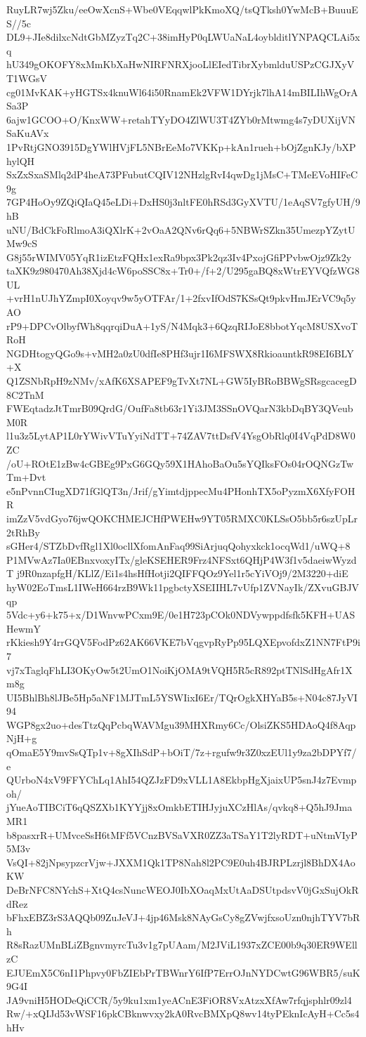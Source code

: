 RuyLR7wj5Zku/eeOwXcnS+Wbe0VEqqwlPkKmoXQ/tsQTksh0YwMcB+BuuuES//5c
DL9+JIe8dilxcNdtGbMZyzTq2C+38imHyP0qLWUaNaL4oyblditlYNPAQCLAi5xq
hU349gOKOFY8xMmKbXaHwNIRFNRXjooLlEIedTibrXybmlduUSPzCGJXyVT1WGsV
cg01MvKAK+yHGTSx4knuWl64i50RnamEk2VFW1DYrjk7lhA14mBILIhWgOrASa3P
6ajw1GCOO+O/KnxWW+retahTYyDO4ZlWU3T4ZYb0rMtwmg4s7yDUXijVNSaKuAVx
1PvRtjGNO3915DgYWlHVjFL5NBrEeMo7VKKp+kAn1rueh+bOjZgnKJy/bXPhylQH
SxZxSxaSMlq2dP4heA73PFubutCQIV12NHzlgRvI4qwDg1jMsC+TMeEVoHIFeC9g
7GP4HoOy9ZQiQIaQ45eLDi+DxHS0j3nltFE0hRSd3GyXVTU/1eAqSV7gfyUH/9hB
uNU/BdCkFoRlmoA3iQXlrK+2vOaA2QNv6rQq6+5NBWrSZkn35UmezpYZytUMw9cS
G8j55rWIMV05YqR1izEtzFQHx1exRa9bpx3Pk2qz3Iv4PxojGfiPPvbwOjz9Zk2y
taXK9z980470Ah38Xjd4cW6poSSC8x+Tr0+/f+2/U295gaBQ8xWtrEYVQfzWG8UL
+vrH1nUJhYZmpI0Xoyqv9w5yOTFAr/1+2fxvIfOdS7KSsQt9pkvHmJErVC9q5yAO
rP9+DPCvOlbyfWh8qqrqiDuA+1yS/N4Mqk3+6QzqRIJoE8bbotYqcM8USXvoTRoH
NGDHtogyQGo9s+vMH2a0zU0dfIe8PHf3ujr1I6MFSWX8RkioauntkR98EI6BLY+X
Q1ZSNbRpH9zNMv/xAfK6XSAPEF9gTvXt7NL+GW5IyBRoBBWgSRsgcacegD8C2TnM
FWEqtadzJtTmrB09QrdG/OufFa8tb63r1Yi3JM3SSnOVQarN3kbDqBY3QVeubM0R
l1u3z5LytAP1L0rYWivVTuYyiNdTT+74ZAV7ttDsfV4YsgObRlq0I4VqPdD8W0ZC
/oU+ROtE1zBw4cGBEg9PxG6GQy59X1HAhoBaOu5sYQIksFOs04rOQNGzTwTm+Dvt
e5nPvnnCIugXD71fGlQT3n/Jrif/gYimtdjppecMu4PHonhTX5oPyzmX6XfyFOHR
imZzV5vdGyo76jwQOKCHMEJCHfPWEHw9YT05RMXC0KLSsO5bb5r6szUpLr2tRhBy
sGHer4/STZbDvfRgl1Xl0ocllXfomAnFaq99SiArjuqQohyxkck1ocqWd1/uWQ+8
P1MVwAz7Ia0EBnxvoxyITx/gleKSEHER9Frz4NFSxt6QHjP4W3f1v5daeiwWyzdT
j9R0nzapfgH/KLlZ/Ei1s4hsHfHotji2QIFFQOz9Yel1r5cYiVOj9/2M3220+diE
hyW02EoTmsL1IWeH664rzB9Wk11pgbctyXSEIIHL7vUfp1ZVNayIk/ZXvuGBJVqp
5Vdc+y6+k75+x/D1WnvwPCxm9E/0e1H723pCOk0NDVywppdfsfk5KFH+UASHewmY
rKkiesh9Y4rrGQV5FodPz62AK66VKE7bVqgvpRyPp95LQXEpvofdxZ1NN7FtP9i7
vj7xTaglqFhLI3OKyOw5t2UmO1NoiKjOMA9tVQH5R5cR892ptTNlSdHgAfr1Xm8g
UI5BhlBh8lJBe5Hp5aNF1MJTmL5YSWIixI6Er/TQrOgkXHYaB5s+N04c87JyVI94
WGP8gx2uo+desTtzQqPcbqWAVMgu39MHXRmy6Cc/OlsiZKS5HDAoQ4f8AqpNjH+g
qOmaE5Y9mvSsQTp1v+8gXIhSdP+bOiT/7z+rgufw9r3Z0xzEUl1y9za2bDPYf7/e
QUrboN4xV9FFYChLq1AhI54QZJzFD9xVLL1A8EkbpHgXjaixUP5snJ4z7Evmpoh/
jYueAoTIBCiT6qQSZXb1KYYjj8xOmkbETIHJyjuXCzHlAs/qvkq8+Q5hJ9JmaMR1
b8pasxrR+UMvceSsH6tMFf5VCnzBVSaVXR0ZZ3aTSaY1T2lyRDT+uNtmVIyP5M3v
VsQI+82jNpsypzcrVjw+JXXM1Qk1TP8Nah8l2PC9E0uh4BJRPLzrjl8BhDX4AoKW
DeBrNFC8NYchS+XtQ4csNuncWEOJ0IbXOaqMxUtAaDSUtpdsvV0jGxSujOkRdRez
bFhxEBZ3rS3AQQb09ZuJeVJ+4jp46Msk8NAyGsCy8gZVwjfxsoUzn0njhTYV7bRh
R8sRazUMnBLiZBgnvmyrcTu3v1g7pUAam/M2JViL1937xZCE00b9q30ER9WEllzC
EJUEmX5C6nI1Phpvy0FbZIEbPrTBWnrY6IfP7ErrOJnNYDCwtG96WBR5/suK9G4I
JA9vniH5HODeQiCCR/5y9ku1xm1yeACnE3FiOR8VxAtzxXfAw7rfqjsphlr09zl4
Rw/+xQIJd53vWSF16pkCBknwvxy2kA0RvcBMXpQ8wv14tyPEknIcAyH+Cc5s4hHv
